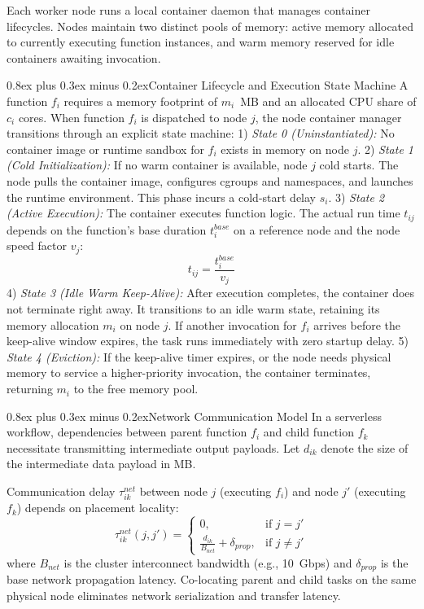 \documentclass[conference]{IEEEtran}
\makeatletter
\def\subsection{\@startsection{subsection}{2}{\z@}{1.8ex plus 0.8ex minus 0.4ex}%
{0.8ex plus 0.3ex minus 0.2ex}{\normalfont\normalsize\bfseries\color{slateheader}}}
\makeatother
\begin{document}
Each worker node runs a local container daemon that manages container lifecycles. Nodes maintain two distinct pools of memory: active memory allocated to currently executing function instances, and warm memory reserved for idle containers awaiting invocation.

\subsection{Container Lifecycle and Execution State Machine}
A function $f_i$ requires a memory footprint of $m_i$~MB and an allocated CPU share of $c_i$ cores. When function $f_i$ is dispatched to node $j$, the node container manager transitions through an explicit state machine:
1) \textit{State 0 (Uninstantiated):} No container image or runtime sandbox for $f_i$ exists in memory on node $j$.
2) \textit{State 1 (Cold Initialization):} If no warm container is available, node $j$ cold starts. The node pulls the container image, configures cgroups and namespaces, and launches the runtime environment. This phase incurs a cold-start delay $s_i$.
3) \textit{State 2 (Active Execution):} The container executes function logic. The actual run time $t_{ij}$ depends on the function's base duration $t_i^{base}$ on a reference node and the node speed factor $v_j$:
\begin{equation}
    t_{ij} = \frac{t_i^{base}}{v_j}
\end{equation}
4) \textit{State 3 (Idle Warm Keep-Alive):} After execution completes, the container does not terminate right away. It transitions to an idle warm state, retaining its memory allocation $m_i$ on node $j$. If another invocation for $f_i$ arrives before the keep-alive window expires, the task runs immediately with zero startup delay.
5) \textit{State 4 (Eviction):} If the keep-alive timer expires, or the node needs physical memory to service a higher-priority invocation, the container terminates, returning $m_i$ to the free memory pool.

\subsection{Network Communication Model}
In a serverless workflow, dependencies between parent function $f_i$ and child function $f_k$ necessitate transmitting intermediate output payloads. Let $d_{ik}$ denote the size of the intermediate data payload in MB.

Communication delay $\tau_{ik}^{net}$ between node $j$ (executing $f_i$) and node $j'$ (executing $f_k$) depends on placement locality:
\begin{equation}
\tau_{ik}^{net}(j, j') = \begin{cases} 
0, & \text{if } j = j' \\ 
\frac{d_{ik}}{B_{net}} + \delta_{prop}, & \text{if } j \neq j' 
\end{cases}
\end{equation}
where $B_{net}$ is the cluster interconnect bandwidth (e.g., 10~Gbps) and $\delta_{prop}$ is the base network propagation latency. Co-locating parent and child tasks on the same physical node eliminates network serialization and transfer latency.
\end{document}
